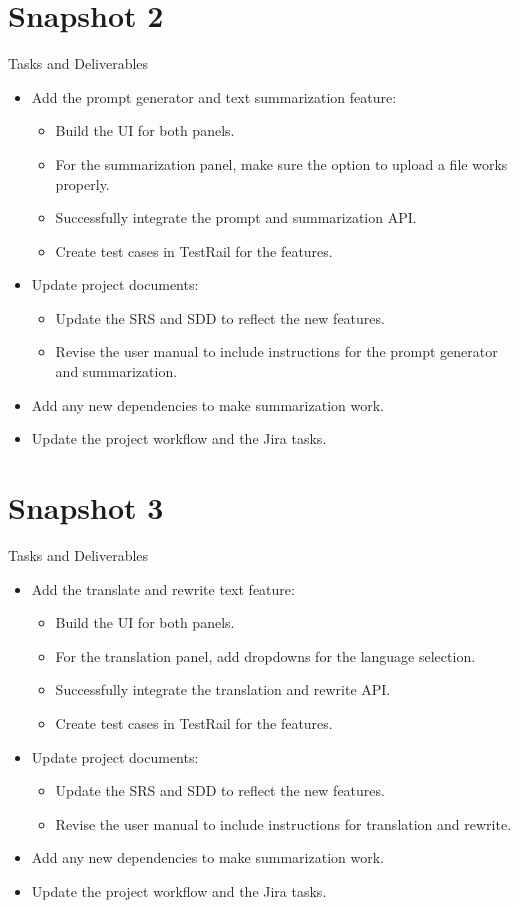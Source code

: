 \documentclass{article}
\begin{document}
\section{Snapshot 2}
Tasks and Deliverables
\begin{itemize}
    \item Add the prompt generator and text summarization feature:
    \begin{itemize}
        \item Build the UI for both panels.
        \item For the summarization panel, make sure the option to upload a file works properly. 
        \item Successfully integrate the prompt and summarization API.
        \item Create test cases in TestRail for the features.
    \end{itemize}
    \item Update project documents:
    \begin{itemize}
        \item Update the SRS and SDD to reflect the new features.
        \item Revise the user manual to include instructions for the prompt generator and summarization.
    \end{itemize}
    \item Add any new dependencies to make summarization work.
    \item Update the project workflow and the Jira tasks.
\end{itemize}

\section{Snapshot 3}
Tasks and Deliverables
\begin{itemize}
    \item Add the translate and rewrite text feature:
    \begin{itemize}
        \item Build the UI for both panels.        
        \item For the translation panel, add dropdowns for the language selection.
        \item Successfully integrate the translation and rewrite API.
        \item Create test cases in TestRail for the features.
    \end{itemize}
    \item Update project documents:
    \begin{itemize}
        \item Update the SRS and SDD to reflect the new features.
        \item Revise the user manual to include instructions for translation and rewrite.
    \end{itemize}
    \item Add any new dependencies to make summarization work.
    \item Update the project workflow and the Jira tasks.
\end{itemize}
\end{document}

